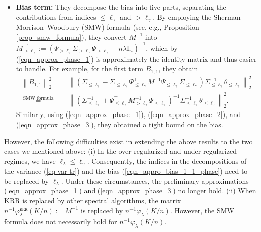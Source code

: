 \documentclass{article}
\theoremstyle{plain}
\theoremstyle{definition}
\theoremstyle{remark}
\newcommand{\reg}{\varphi_\lambda}
\newcommand*{\krr}{\mathtt{KRR}}
\newcommand{\green}{\color{green}}
\begin{document}
\begin{appendix}
\begin{itemize}
\begin{itemize}
    \item {\bf Bias term: } They decompose the bias into five parts, separating the contributions from indices $\leq \ell_{\gamma}$ and $> \ell_{\gamma}$. By employing the Sherman–Morrison–Woodbury (SMW) formula (see, e.g., Proposition \ref{prop_smw_formula}), they convert $M^{-1}$ into $M_{>\ell_{\gamma}}^{-1} := (\Psi_{>\ell_{\gamma}} \Sigma_{>\ell_{\gamma}} \Psi_{>\ell_{\gamma}}^{\top} + n\lambda \mathrm{I}_n)^{-1}$, which by (\ref{eqn_approx_phase_1}) is approximately the identity matrix and thus easier to handle. For example, for the first term $B_{1, 1}$, they obtain
    \begin{equation}\label{eqn_appro_bias_1_1_phase}
     \begin{aligned}
        \left\|B_{1, 1}\right\|_{2}^{2} 
        =&~ \left\| \left( \Sigma_{\le \ell_{\gamma}} - \Sigma_{\le \ell_{\gamma}} \Psi^{\top}_{\le \ell_{\gamma}} M^{-1} \Psi_{\le \ell_{\gamma}} \Sigma_{\le \ell_{\gamma}}\right)  \Sigma_{\le \ell_{\gamma}}^{-1}  \theta_{\le \ell_{\gamma}} \right\|_{2}^{2}\\
        \overset{\text{ SMW formula } }{=} &~
        \left\| \left( \Sigma_{\le \ell_{\gamma}}^{-1} + \Psi_{\le \ell_{\gamma}}^{\top} M_{>\ell_{\gamma}}^{-1} \Psi_{\le \ell_{\gamma}}  \right)^{-1}  \Sigma_{\le \ell_{\gamma}}^{-1}  \theta_{\le \ell_{\gamma}} \right\|_{2}^{2}.
    \end{aligned}
    \end{equation}
    Similarly, using (\ref{eqn_approx_phase_1}), (\ref{eqn_approx_phase_2}), and (\ref{eqn_approx_phase_3}), they obtained a tight bound on the bias.

\end{itemize}

\end{itemize}
\fi




However, the following difficulties exist in extending the above results to the two cases we mentioned above:
(i) In the over-regularized and under-regularized regimes, we have $\ell_{\lambda} \leq \ell_{\gamma}$. Consequently, the indices in the decompositions of the variance (\ref{eq var tr}) and the bias (\ref{eqn_appro_bias_1_1_phase}) need to be replaced by $\ell_\lambda$. Under these circumstances, the preliminary approximations (\ref{eqn_approx_phase_1}) and (\ref{eqn_approx_phase_3}) no longer hold.
(ii) When KRR is replaced by other spectral algorithms, the matrix $n^{-1} \reg^{\krr}(K/n) := M^{-1}$ is replaced by $n^{-1} \reg(K/n)$. However, the SMW formula does not necessarily hold for $n^{-1} \reg(K/n)$. 


\end{appendix}
\end{document}
